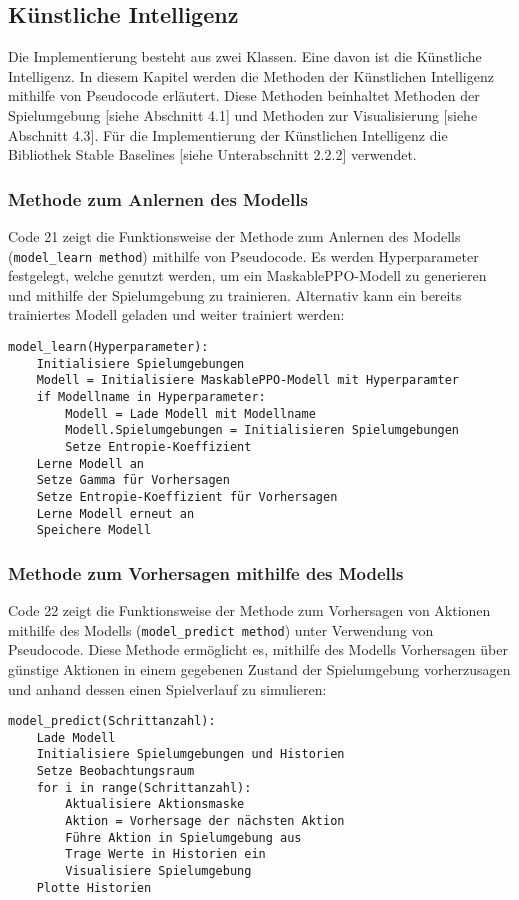 \subsection{Künstliche Intelligenz}
Die Implementierung besteht aus zwei Klassen. Eine davon ist die Künstliche Intelligenz. In diesem Kapitel werden die Methoden der Künstlichen Intelligenz mithilfe von Pseudocode erläutert. Diese Methoden beinhaltet Methoden der Spielumgebung [siehe Abschnitt 4.1] und Methoden zur Visualisierung [siehe Abschnitt 4.3]. Für die Implementierung der Künstlichen Intelligenz die Bibliothek Stable Baselines [siehe Unterabschnitt 2.2.2] verwendet.
\subsubsection{Methode zum Anlernen des Modells}
\begin{minipage}{\linewidth}
Code 21 zeigt die Funktionsweise der Methode zum Anlernen des Modells (\texttt{model\_learn method}) mithilfe von Pseudocode. Es werden Hyperparameter festgelegt, welche genutzt werden, um ein MaskablePPO-Modell zu generieren und mithilfe der Spielumgebung zu trainieren. Alternativ kann ein bereits trainiertes Modell geladen und weiter trainiert werden:
\vspace{0.5cm}
\begin{lstlisting}[caption={Methode zu Anlernen des Modells}]
model_learn(Hyperparameter):
	Initialisiere Spielumgebungen
	Modell = Initialisiere MaskablePPO-Modell mit Hyperparamter
	if Modellname in Hyperparameter:
		Modell = Lade Modell mit Modellname
		Modell.Spielumgebungen = Initialisieren Spielumgebungen
		Setze Entropie-Koeffizient
	Lerne Modell an
	Setze Gamma für Vorhersagen
	Setze Entropie-Koeffizient für Vorhersagen
	Lerne Modell erneut an
	Speichere Modell
\end{lstlisting}
\end{minipage}
\subsubsection{Methode zum Vorhersagen mithilfe des Modells}
\begin{minipage}{\linewidth}
Code 22 zeigt die Funktionsweise der Methode zum Vorhersagen von Aktionen mithilfe des Modells (\texttt{model\_predict method}) unter Verwendung von Pseudocode. Diese Methode ermöglicht es, mithilfe des Modells Vorhersagen über günstige Aktionen in einem gegebenen Zustand der Spielumgebung vorherzusagen und anhand dessen einen Spielverlauf zu simulieren:
\vspace{0.5cm}
\begin{lstlisting}[caption={Methode zum Vorhersagen von Aktionen mithilfe des Modells}]
model_predict(Schrittanzahl):
	Lade Modell
	Initialisiere Spielumgebungen und Historien
	Setze Beobachtungsraum
	for i in range(Schrittanzahl):
		Aktualisiere Aktionsmaske
		Aktion = Vorhersage der nächsten Aktion
		Führe Aktion in Spielumgebung aus
		Trage Werte in Historien ein
		Visualisiere Spielumgebung
	Plotte Historien
\end{lstlisting}
\end{minipage}
